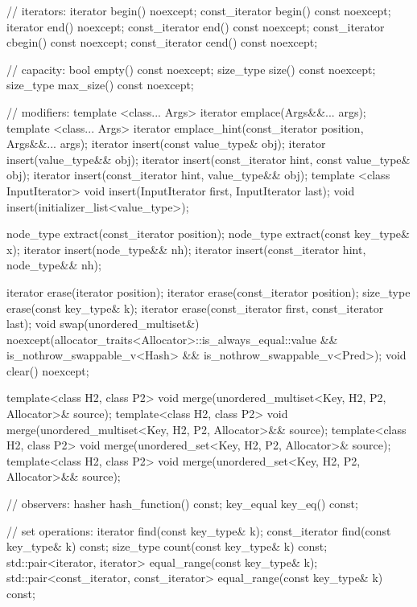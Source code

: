 \begin{codeblock}
{{    // iterators:
    iterator       begin() noexcept;
    const_iterator begin() const noexcept;
    iterator       end() noexcept;
    const_iterator end() const noexcept;
    const_iterator cbegin() const noexcept;
    const_iterator cend() const noexcept;

    // capacity:
    bool      empty() const noexcept;
    size_type size() const noexcept;
    size_type max_size() const noexcept;

    // modifiers:
    template <class... Args> iterator emplace(Args&&... args);
    template <class... Args> iterator emplace_hint(const_iterator position, Args&&... args);
    iterator insert(const value_type& obj);
    iterator insert(value_type&& obj);
    iterator insert(const_iterator hint, const value_type& obj);
    iterator insert(const_iterator hint, value_type&& obj);
    template <class InputIterator> void insert(InputIterator first, InputIterator last);
    void insert(initializer_list<value_type>);

    node_type extract(const_iterator position);
    node_type extract(const key_type& x);
    iterator insert(node_type&& nh);
    iterator insert(const_iterator hint, node_type&& nh);

    iterator  erase(iterator position);
    iterator  erase(const_iterator position);
    size_type erase(const key_type& k);
    iterator  erase(const_iterator first, const_iterator last);
    void      swap(unordered_multiset&)
      noexcept(allocator_traits<Allocator>::is_always_equal::value &&
               is_nothrow_swappable_v<Hash> &&
               is_nothrow_swappable_v<Pred>);
    void      clear() noexcept;

    template<class H2, class P2>
      void merge(unordered_multiset<Key, H2, P2, Allocator>& source);
    template<class H2, class P2>
      void merge(unordered_multiset<Key, H2, P2, Allocator>&& source);
    template<class H2, class P2>
      void merge(unordered_set<Key, H2, P2, Allocator>& source);
    template<class H2, class P2>
      void merge(unordered_set<Key, H2, P2, Allocator>&& source);

    // observers:
    hasher hash_function() const;
    key_equal key_eq() const;

    // set operations:
    iterator       find(const key_type& k);
    const_iterator find(const key_type& k) const;
    size_type      count(const key_type& k) const;
    std::pair<iterator, iterator>             equal_range(const key_type& k);
    std::pair<const_iterator, const_iterator> equal_range(const key_type& k) const;

}}
\end{codeblock}
